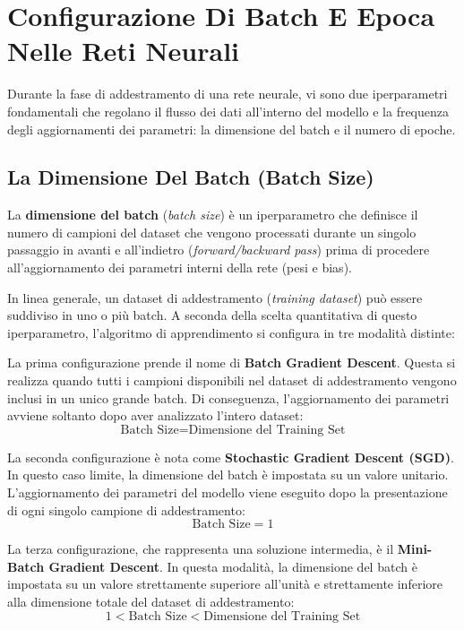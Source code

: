 ﻿\documentclass[11pt, a4paper]{article}
\begin{document}
\newpage

\section{Configurazione Di Batch E Epoca Nelle Reti Neurali}

Durante la fase di addestramento di una rete neurale, vi sono due iperparametri fondamentali che regolano il flusso dei dati all'interno del modello e la frequenza degli aggiornamenti dei parametri: la dimensione del batch e il numero di epoche.

\subsection{La Dimensione Del Batch (Batch Size)}

La \textbf{dimensione del batch} (\emph{batch size}) è un iperparametro che definisce il numero di campioni del dataset che vengono processati durante un singolo passaggio in avanti e all'indietro (\emph{forward/backward pass}) prima di procedere all'aggiornamento dei parametri interni della rete (pesi e bias).

In linea generale, un dataset di addestramento (\emph{training dataset}) può essere suddiviso in uno o più batch. A seconda della scelta quantitativa di questo iperparametro, l'algoritmo di apprendimento si configura in tre modalità distinte:

La prima configurazione prende il nome di \textbf{Batch Gradient Descent}. Questa si realizza quando tutti i campioni disponibili nel dataset di addestramento vengono inclusi in un unico grande batch. Di conseguenza, l'aggiornamento dei parametri avviene soltanto dopo aver analizzato l'intero dataset:
\[ \boxed{\text{Batch Size} = \text{Dimensione del Training Set}} \]

La seconda configurazione è nota come \textbf{Stochastic Gradient Descent (SGD)}. In questo caso limite, la dimensione del batch è impostata su un valore unitario. L'aggiornamento dei parametri del modello viene eseguito dopo la presentazione di ogni singolo campione di addestramento:
\[ \boxed{\text{Batch Size} = 1} \]

La terza configurazione, che rappresenta una soluzione intermedia, è il \textbf{Mini-Batch Gradient Descent}. In questa modalità, la dimensione del batch è impostata su un valore strettamente superiore all'unità e strettamente inferiore alla dimensione totale del dataset di addestramento:
\[ \boxed{1 < \text{Batch Size} < \text{Dimensione del Training Set}} \]
\end{document}
